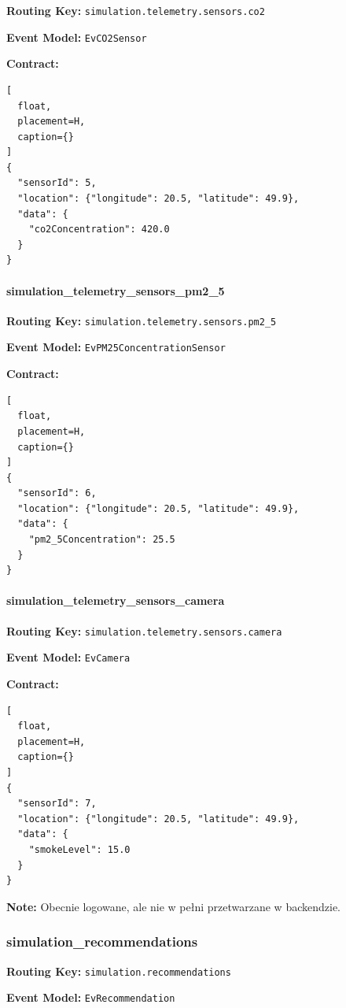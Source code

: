 \documentclass[11pt,a4paper] {article}
\begin{document}
\textbf{Routing Key:} \texttt{simulation.telemetry.sensors.co2}

\textbf{Event Model:} \texttt{EvCO2Sensor}

\textbf{Contract:}
\begin{lstlisting}[
  float,
  placement=H,
  caption={}
] 
{
  "sensorId": 5,
  "location": {"longitude": 20.5, "latitude": 49.9},
  "data": {
    "co2Concentration": 420.0
  }
}
\end{lstlisting}

\paragraph{simulation\_telemetry\_sensors\_pm2\_5}

\textbf{Routing Key:} \texttt{simulation.telemetry.sensors.pm2\_5}

\textbf{Event Model:} \texttt{EvPM25ConcentrationSensor}

\textbf{Contract:}
\begin{lstlisting}[
  float,
  placement=H,
  caption={}
] 
{
  "sensorId": 6,
  "location": {"longitude": 20.5, "latitude": 49.9},
  "data": {
    "pm2_5Concentration": 25.5
  }
}
\end{lstlisting}

\paragraph{simulation\_telemetry\_sensors\_camera}

\textbf{Routing Key:} \texttt{simulation.telemetry.sensors.camera}

\textbf{Event Model:} \texttt{EvCamera}

\textbf{Contract:}
\begin{lstlisting}[
  float,
  placement=H,
  caption={}
] 
{
  "sensorId": 7,
  "location": {"longitude": 20.5, "latitude": 49.9},
  "data": {
    "smokeLevel": 15.0
  }
}
\end{lstlisting}

\textbf{Note:} Obecnie logowane, ale nie w pełni przetwarzane w backendzie.

\subsubsection{simulation\_recommendations}

\textbf{Routing Key:} \texttt{simulation.recommendations}

\textbf{Event Model:} \texttt{EvRecommendation}
\end{document}
